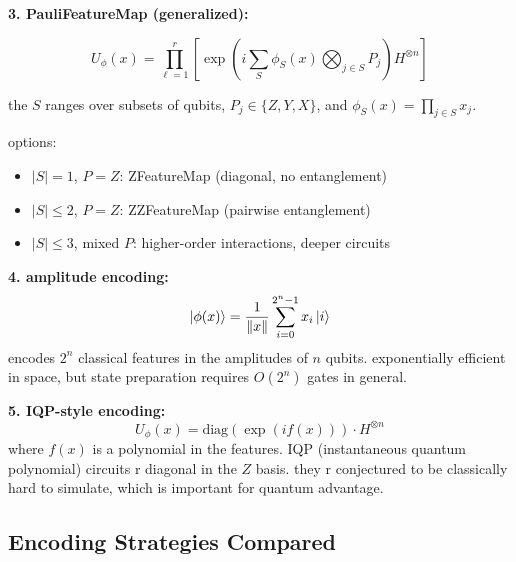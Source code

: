 \documentclass[11pt,a4paper]{article}
\theoremstyle{definition}
\theoremstyle{remark}
\begin{document}
\textbf{3. PauliFeatureMap (generalized):}

\[
U_\phi(x) = \prod_{\ell=1}^{r}\left[\exp\left(i\sum_{S} \phi_S(x) \bigotimes_{j\in S} P_j\right) H^{\otimes n}\right]
\]

the $S$ ranges over subsets of qubits, $P_j \in \{Z, Y, X\}$, and $\phi_S(x) = \prod_{j \in S} x_j$.

options:
\begin{itemize}
    \item $|S| = 1$, $P = Z$: ZFeatureMap (diagonal, no entanglement)
    \item $|S| \leq 2$, $P = Z$: ZZFeatureMap (pairwise entanglement)
    \item $|S| \leq 3$, mixed $P$: higher-order interactions, deeper circuits
\end{itemize}

\textbf{4. amplitude encoding:}
\[
\ket{\phi(x)} = \frac{1}{\|x\|}\sum_{i=0}^{2^n - 1} x_i \ket{i}
\]
encodes $2^n$ classical features in the amplitudes of $n$ qubits. exponentially efficient in space, but state preparation requires $O(2^n)$ gates in general.

\textbf{5. IQP-style encoding:}
\[
U_\phi(x) = \text{diag}\left(\exp(i f(x))\right) \cdot H^{\otimes n}
\]
where $f(x)$ is a polynomial in the features. IQP (instantaneous quantum polynomial) circuits r diagonal in the $Z$ basis. they r conjectured to be classically hard to simulate, which is important for quantum advantage.

\subsection{Encoding Strategies Compared}

\begin{center}
\end{center}
\end{document}
